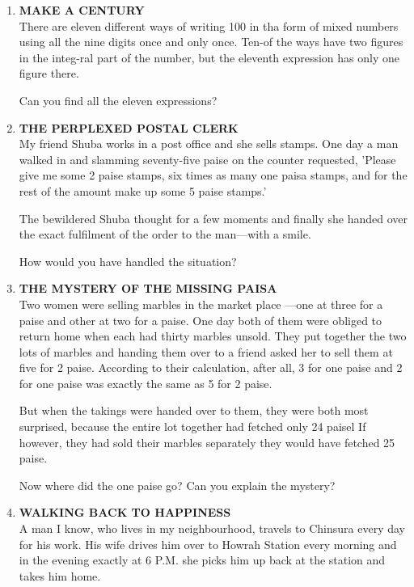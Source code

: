 \documentclass[12pt]{article}
\begin{document}
\begin{enumerate}
%
\item \textbf{MAKE  A CENTURY} \\
There  are eleven  different  ways  of writing  100  in tha form  of mixed  numbers  using  all the nine  digits  once  and only once.  Ten-of  the ways  have  two figures  in the integ-ral part  of the number,  but  the  eleventh  expression  has only one figure  there. 

Can you find  all the eleven  expressions? 
%
\item \textbf{THE  PERPLEXED  POSTAL  CLERK} \\ 
My friend  Shuba  works  in a post  office  and  she  sells stamps.  One  day a man  walked  in and slamming  seventy-five paise  on the counter  requested,  'Please  give  me some 2 paise  stamps,  six times  as many  one paisa  stamps,  and for the  rest  of the amount  make  up some  5 paise stamps.' 

The bewildered  Shuba  thought  for a few  moments and finally  she handed  over  the  exact  fulfilment  of the order  to the man—with  a smile. 

How  would  you have  handled  the situation? 

%
\item \textbf{THE  MYSTERY  OF THE  MISSING  PAISA} \\
Two women  were  selling  marbles  in the  market  place —one  at three  for a paise  and other  at two for a paise. One day both  of them  were  obliged  to return  home  when each had  thirty  marbles  unsold.  They  put together  the two lots  of marbles  and handing  them  over  to a friend asked  her  to sell  them  at five for 2 paise.  According  to their calculation,  after  all, 3 for one  paise  and  2 for one paise  was exactly  the same  as 5 for 2 paise. 

But when  the takings  were  handed  over  to them,  they were  both  most  surprised,  because  the entire  lot together had fetched  only  24 paisel  If however,  they  had  sold their marbles  separately  they  would  have  fetched  25 paise. 

Now  where  did  the  one  paise  go? Can  you explain the mystery? 

%
\item \textbf{WALKING  BACK  TO HAPPINESS} \\
A man  I know,  who  lives  in my  neighbourhood, travels  to Chinsura  every  day  for his work.  His  wife drives  him  over  to Howrah  Station  every  morning  and in the evening  exactly  at 6 P.M.  she  picks  him  up back  at the station  and takes  him home. 


\end{enumerate}
\end{document}
